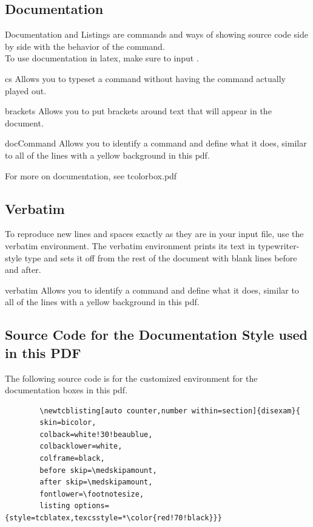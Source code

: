 \documentclass[12pt,hidelinks]{article}
\begin{document}
	\subsection{Documentation}
	Documentation and Listings are commands and ways of showing source code side by side with the behavior of the command.\\
	To use documentation in latex, make sure to input .
		\begin{docCommand}{cs}{}
			Allows you to typeset a command without having the command actually played out.
		\end{docCommand}
		\begin{disexam}
		\end{disexam}
		\begin{docCommand}{brackets}{}
			Allows you to put brackets around text that will appear in the document.
		\end{docCommand}
		\begin{disexam}
		\end{disexam}
		\begin{docEnvironment}{docCommand}{}
			Allows you to identify a command and define what it does, similar to all of the lines with a yellow background in this pdf.
		\end{docEnvironment}
		For more on documentation, see tcolorbox.pdf
	\subsection{Verbatim}
		To reproduce new lines and spaces exactly as they are in your input file, use the verbatim environment. The verbatim environment prints its text in typewriter-style type and sets it off from the rest of the document with blank lines before and after.
		\begin{docEnvironment}{verbatim}{}
			Allows you to identify a command and define what it does, similar to all of the lines with a yellow background in this pdf.
		\end{docEnvironment}
\newpage
	\subsection{Source Code for the Documentation Style used in this PDF}
	The following source code is for the customized environment for the documentation boxes in this pdf. 
		\begin{verbatim}
		\newtcblisting[auto counter,number within=section]{disexam}{
		skin=bicolor,
		colback=white!30!beaublue,
		colbacklower=white,
		colframe=black,
		before skip=\medskipamount,
		after skip=\medskipamount,
		fontlower=\footnotesize,
		listing options={style=tcblatex,texcsstyle=*\color{red!70!black}}}
		\end{verbatim}
\newpage
\end{document}
